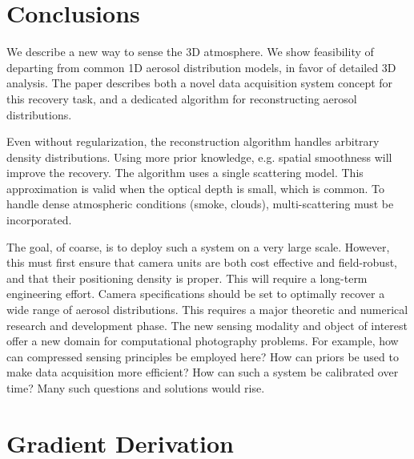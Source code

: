 \documentclass[10pt,letterpaper]{article}
\begin{document}

\section{Conclusions}
\label{sec:conclusions}

We describe a new way to sense the 3D atmosphere. We show feasibility
of departing from common 1D aerosol distribution models, in favor of
detailed 3D analysis.  The paper describes both a novel data
acquisition system concept for this recovery task, and a dedicated
algorithm for reconstructing aerosol distributions.

Even without regularization, the reconstruction algorithm handles
arbitrary density distributions. Using more prior knowledge,
e.g. spatial smoothness will improve the recovery.  The algorithm uses
a single scattering model. This approximation is valid when the
optical depth is small, which is common. To handle dense atmospheric
conditions (smoke, clouds), multi-scattering must be incorporated.

The goal, of coarse, is to deploy such a system on a very large
scale. However, this must first ensure that camera units are both cost
effective and field-robust, and that their positioning density is
proper. This will require a long-term engineering effort. Camera
specifications should be set to optimally recover a wide range of
aerosol distributions. This requires a major theoretic and numerical
research and development phase.  The new sensing modality and object
of interest offer a new domain for computational photography
problems. For example, how can compressed sensing principles be
employed here? How can priors be used to make data acquisition more
efficient? How can such a system be calibrated over time? Many such
questions and solutions would rise.



\section{Gradient Derivation}
\label{sec:gradient-derivation}
\end{document}
